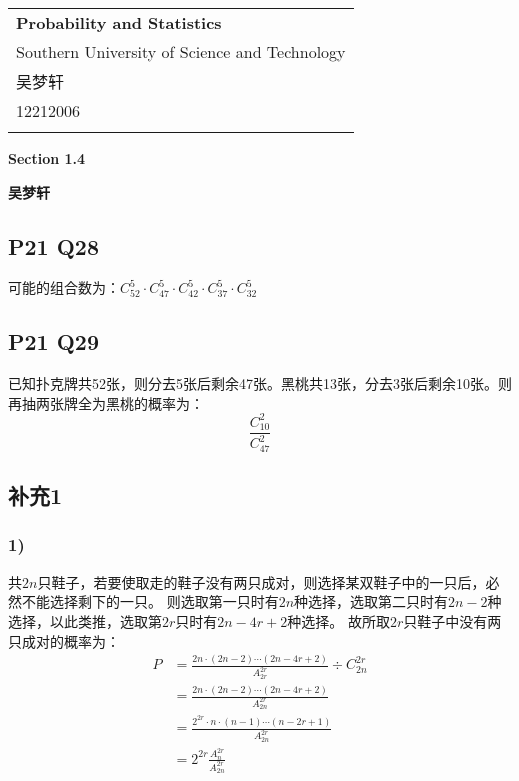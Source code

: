 \documentclass[a4paper,12pt]{ctexart}
\begin{document}
\thispagestyle{empty} %

\begin{tabular}{p{15.5cm}}
{\large \bf Probability and Statistics} \\
Southern University of Science and Technology \\ 吴梦轩 \\ 12212006 \\
\hline
\\
\end{tabular}

\vspace*{0.3cm} %

\begin{center}
	{\Large \bf Section 1.4}
	\vspace{2mm}

	{\bf 吴梦轩}
		
\end{center}  

\vspace{0.4cm}

\subsection*{P21 Q28}
可能的组合数为：$C_{52}^5 \cdot C_{47}^5 \cdot C_{42}^5 \cdot C_{37}^5 \cdot C_{32}^5$

\subsection*{P21 Q29}

已知扑克牌共52张，则分去5张后剩余47张。黑桃共13张，分去3张后剩余10张。则再抽两张牌全为黑桃的概率为：
\begin{equation*}
	\frac{C^{2}_{10}}{C^{2}_{47}}
\end{equation*}

\subsection*{补充1}

\subsubsection*{1)}

共$2n$只鞋子，若要使取走的鞋子没有两只成对，则选择某双鞋子中的一只后，必然不能选择剩下的一只。
则选取第一只时有$2n$种选择，选取第二只时有$2n-2$种选择，以此类推，选取第$2r$只时有$2n-4r+2$种选择。
故所取$2r$只鞋子中没有两只成对的概率为：
\begin{align*}
	P &= \frac{2n \cdot (2n-2) \cdots (2n-4r+2)}{A^{2r}_{2r}} \div {C^{2r}_{2n}}\\
	&= \frac{2n \cdot (2n-2) \cdots (2n-4r+2)}{A^{2r}_{2n}}\\
	&= \frac{2^{2r} \cdot n \cdot (n-1) \cdots (n-2r+1)}{A^{2r}_{2n}}\\
	&= 2^{2r} \frac{A^{2r}_{n}}{A^{2r}_{2n}}
\end{align*}
\end{document}
